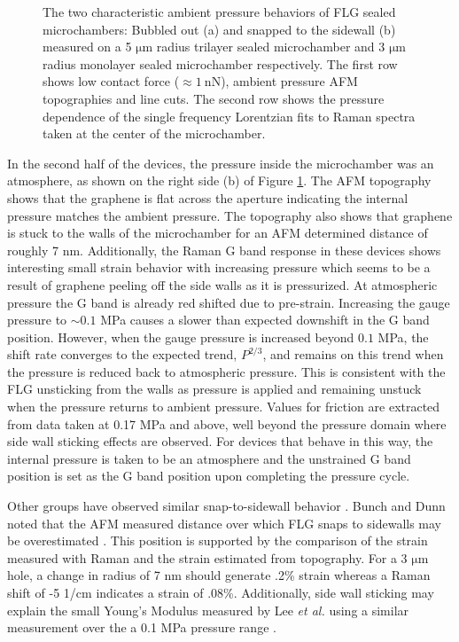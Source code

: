 \begin{figure}
	\begin{center}
	
	\end{center}
	\caption[Characteristic ambient pressure behavior of FLG sealed microchambers]{\label{fig:fri:ambient}
	The two characteristic ambient pressure behaviors of FLG sealed microchambers: Bubbled out (a) and snapped to the sidewall (b) measured on a 5 $\mathrm{\mu}$m radius trilayer sealed microchamber and 3 $\mathrm{\mu}$m radius monolayer sealed microchamber respectively.
	The first row shows low contact force ($\approx 1\ \mathrm{nN}$), ambient pressure AFM topographies and line cuts.
	The second row shows the pressure dependence of the single frequency Lorentzian fits to Raman spectra taken at the center of the microchamber.}
\end{figure}

In the second half of the devices, the pressure inside the microchamber was an atmosphere, as shown on the right side (b) of Figure \ref{fig:fri:ambient}.
The AFM topography shows that the graphene is flat across the aperture indicating the internal pressure matches the ambient pressure.
The topography also shows that graphene is stuck to the walls of the microchamber for an AFM determined distance of roughly 7 nm.
Additionally, the Raman G band response in these devices shows interesting small strain behavior with increasing pressure which seems to be a result of graphene peeling off the side walls as it is pressurized.
At atmospheric pressure the G band is already red shifted due to pre-strain.
Increasing the gauge pressure to $\sim 0.1$ MPa causes a slower than expected downshift in the G band position.
However, when the gauge pressure is increased beyond $0.1$ MPa, the shift rate converges to the expected trend, $P^{2/3}$, and remains on this trend when the pressure is reduced back to atmospheric pressure.
This is consistent with the FLG unsticking from the walls as pressure is applied and remaining unstuck when the pressure returns to ambient pressure.
Values for friction are extracted from data taken at 0.17 MPa and above, well beyond the pressure domain where side wall sticking effects are observed.
For devices that behave in this way, the internal pressure is taken to be an atmosphere and the unstrained G band position is set as the G band position upon completing the pressure cycle.

Other groups have observed similar snap-to-sidewall behavior \cite{Lee2008,Bunch2008}.
Bunch and Dunn noted that the AFM measured distance over which FLG snaps to sidewalls may be overestimated \cite{Bunch2012}.
This position is supported by the comparison of the strain measured with Raman and the strain estimated from topography.
For a 3 $\mathrm{\mu}$m hole, a change in radius of 7 nm should generate .2\% strain whereas a Raman shift of -5 1/cm indicates a strain of .08\%.
Additionally, side wall sticking may explain the small Young's Modulus measured by Lee \textit{et al.} using a similar measurement over the a 0.1 MPa pressure range \cite{Lee2012}.

